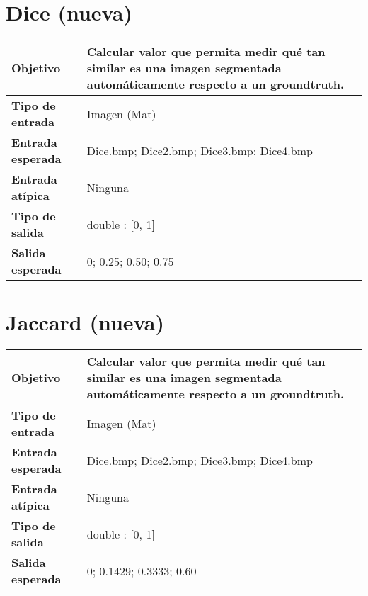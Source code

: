 \documentclass{scrreprt}
\begin{document}
\section{Dice (nueva)}

\vspace{0.3cm}
\begin{center}
    \begin{tabular}{|p{4.0cm}|p{9.0cm}|}
        \hline
	    \textbf{Objetivo} & Calcular valor que permita medir qué tan similar es una imagen segmentada automáticamente respecto a un groundtruth. \\
        \hline
	    \textbf{Tipo de entrada} & Imagen (Mat) \\
        \hline
	    \textbf{Entrada esperada} & Dice.bmp; Dice2.bmp; Dice3.bmp; Dice4.bmp \\
        \hline
	    \textbf{Entrada atípica} & Ninguna \\
        \hline
		\textbf{Tipo de salida} & double : [0, 1] \\
        \hline
	    \textbf{Salida esperada} & 0; 0.25; 0.50; 0.75 \\
        \hline        
    \end{tabular}
\end{center}


\section{Jaccard (nueva)}
\vspace{0.3cm}
\begin{center}
    \begin{tabular}{|p{4.0cm}|p{9.0cm}|}
        \hline
	    \textbf{Objetivo} & Calcular valor que permita medir qué tan similar es una imagen segmentada automáticamente respecto a un groundtruth. \\
        \hline
	    \textbf{Tipo de entrada} & Imagen (Mat) \\
        \hline
	    \textbf{Entrada esperada} & Dice.bmp; Dice2.bmp; Dice3.bmp; Dice4.bmp \\
        \hline
	    \textbf{Entrada atípica} & Ninguna \\
        \hline
	    \textbf{Tipo de salida} & double : [0, 1] \\
        \hline
	    \textbf{Salida esperada} & 0; 0.1429; 0.3333; 0.60 \\
        \hline        
    \end{tabular}
\end{center}
\end{document}
